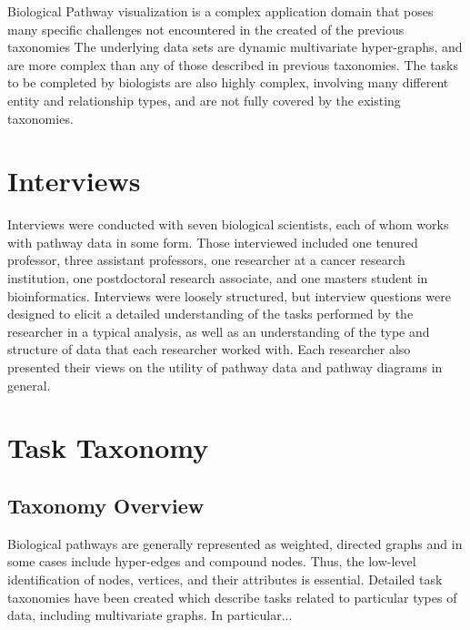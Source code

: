 \documentclass{egpubl}
\begin{document}

Biological Pathway visualization is a complex application domain that poses many specific challenges not encountered in the created of the previous taxonomies
The underlying data sets are dynamic multivariate hyper-graphs, and are more complex than any of those described in previous taxonomies.
The tasks to be completed by biologists are also highly complex, involving many different entity and relationship types, and are not fully covered by the existing taxonomies.


\section{Interviews}

Interviews were conducted with seven biological scientists, each of whom works with pathway data in some form.
Those interviewed included one tenured professor, three assistant professors, one researcher at a cancer research institution, one postdoctoral research associate, and one masters student in bioinformatics.
Interviews were loosely structured, but interview questions were designed to elicit a detailed understanding of the tasks performed by the researcher in a typical analysis, as well as an understanding of the type and structure of data that each researcher worked with.
Each researcher also presented their views on the utility of pathway data and pathway diagrams in general.

\section{Task Taxonomy}

\subsection{Taxonomy Overview}

Biological pathways are generally represented as weighted, directed graphs and in some cases include hyper-edges and compound nodes.
Thus, the low-level identification of nodes, vertices, and their attributes is essential.
Detailed task taxonomies have been created which describe tasks related to particular types of data, including multivariate graphs.
In particular...
\end{document}
